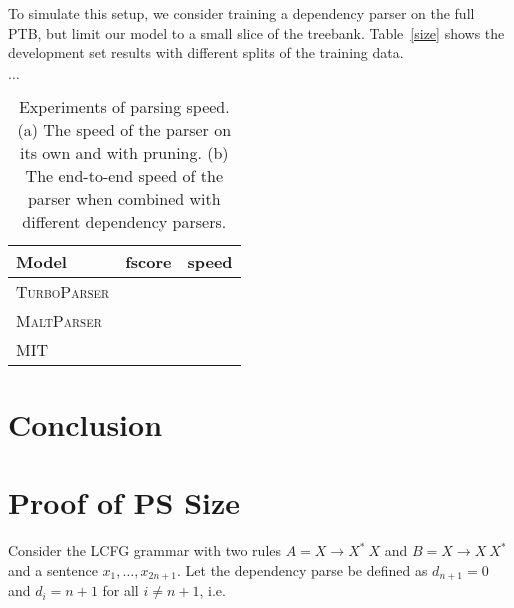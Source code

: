 \documentclass[11pt,letterpaper]{article}
\newcommand{\RuleA}[3]{#1 \rightarrow #2^*\ #3}
\newcommand{\RuleB}[3]{#1 \rightarrow #2\ #3^*}
\begin{document}
To simulate this setup, we consider training a dependency parser on the full PTB, but limit our model to a small slice of the treebank. Table~\ref{size} shows the development set results with different splits of the training data.

$\ldots$

\begin{table}
  \centering
  \begin{tabular}{|l|ll|}
    \hline
    Model & fscore & speed  \\
    \hline
    \textsc{TurboParser} & & \\
    \textsc{MaltParser} & & \\
    \textsc{MIT} & & \\
    \hline
  \end{tabular}

  \label{tab:speed}
  \caption{Experiments of parsing speed. (a) The speed of the parser on its own and with pruning. (b) The end-to-end speed of the parser when combined with different dependency parsers. }
\end{table}




\section{Conclusion}



\appendix{}

\section{Proof of PS Size}
\label{app:proof}

Consider the LCFG grammar with two rules $A = \RuleA{X}{X}{X}$ and  $ B = \RuleB{X}{X}{X}$ and a sentence $x_1, \ldots, x_{2n+1}$. Let the dependency parse be defined as $d_{n+1} = 0$ and $d_i = n+1$ for all $i \neq n + 1$, i.e.

\begin{center}

\end{center}
\end{document}
